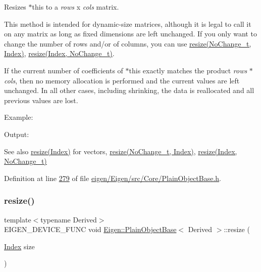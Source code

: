 Resizes {\ttfamily $\ast$this} to a {\itshape rows} x {\itshape cols} matrix.

This method is intended for dynamic-\/size matrices, although it is legal to call it on any matrix as long as fixed dimensions are left unchanged. If you only want to change the number of rows and/or of columns, you can use \hyperlink{class_eigen_1_1_plain_object_base_ab71a655f73d05a0e389e3ed13b6fe5f3}{resize(\+No\+Change\+\_\+t, Index)}, \hyperlink{class_eigen_1_1_plain_object_base_a7b44761b7350ae3756035bbf7d7c04f6}{resize(\+Index, No\+Change\+\_\+t)}.

If the current number of coefficients of {\ttfamily $\ast$this} exactly matches the product {\itshape rows} $\ast$ {\itshape cols}, then no memory allocation is performed and the current values are left unchanged. In all other cases, including shrinking, the data is reallocated and all previous values are lost.

Example\+: 
\begin{DoxyCodeInclude}
\end{DoxyCodeInclude}
 Output\+: 
\begin{DoxyVerbInclude}
\end{DoxyVerbInclude}


\begin{DoxySeeAlso}{See also}
\hyperlink{class_eigen_1_1_plain_object_base_abf8a9ec07cd52a2cdabb527596f7ddd1}{resize(\+Index)} for vectors, \hyperlink{class_eigen_1_1_plain_object_base_ab71a655f73d05a0e389e3ed13b6fe5f3}{resize(\+No\+Change\+\_\+t, Index)}, \hyperlink{class_eigen_1_1_plain_object_base_a7b44761b7350ae3756035bbf7d7c04f6}{resize(\+Index, No\+Change\+\_\+t)} 
\end{DoxySeeAlso}


Definition at line \hyperlink{eigen_2_eigen_2src_2_core_2_plain_object_base_8h_source_l00279}{279} of file \hyperlink{eigen_2_eigen_2src_2_core_2_plain_object_base_8h_source}{eigen/\+Eigen/src/\+Core/\+Plain\+Object\+Base.\+h}.

\mbox{\label{class_eigen_1_1_plain_object_base_abf8a9ec07cd52a2cdabb527596f7ddd1}} 
\subsubsection{\texorpdfstring{resize()}{resize()}\hspace{0.1cm}{\footnotesize\ttfamily [3/8]}}
{\footnotesize\ttfamily template$<$typename Derived$>$ \\
E\+I\+G\+E\+N\+\_\+\+D\+E\+V\+I\+C\+E\+\_\+\+F\+U\+NC void \hyperlink{class_eigen_1_1_plain_object_base}{Eigen\+::\+Plain\+Object\+Base}$<$ Derived $>$\+::resize (\begin{DoxyParamCaption}\item[{\hyperlink{namespace_eigen_a62e77e0933482dafde8fe197d9a2cfde}{Index}}]{size }\end{DoxyParamCaption})\hspace{0.3cm}{\ttfamily [inline]}}


